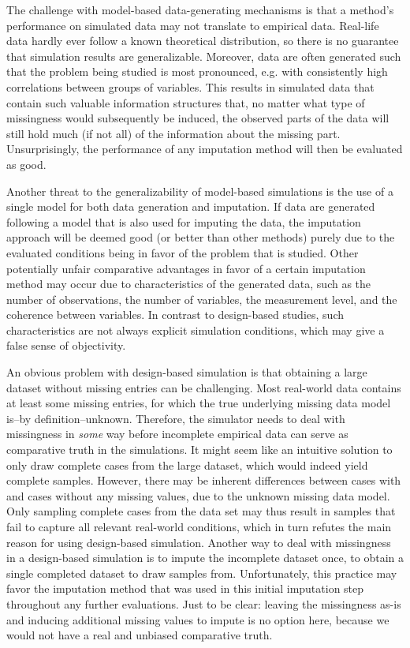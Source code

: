 \documentclass[bimj,fleqn]{w-art}
\begin{document}
The challenge with model-based data-generating mechanisms is that a method's performance on simulated data may not translate to empirical data. Real-life data hardly ever follow a known theoretical distribution, so there is no guarantee that simulation results are generalizable. Moreover, data are often generated such that the problem being studied is most pronounced, e.g. with consistently high correlations between groups of variables. This results in simulated data that contain such valuable information structures that, no matter what type of missingness would subsequently be induced, the observed parts of the data will still hold much (if not all) of the information about the missing part. Unsurprisingly, the performance of any imputation method will then be evaluated as good.

Another threat to the generalizability of model-based simulations is the use of a single model for both data generation and imputation. If data are generated following a model that is also used for imputing the data, the imputation approach will be deemed good (or better than other methods) purely due to the evaluated conditions being in favor of the problem that is studied. Other potentially unfair comparative advantages in favor of a certain imputation method may occur due to characteristics of the generated data, such as the number of observations, the number of variables, the measurement level, and the coherence between variables. In contrast to design-based studies, such characteristics are not always explicit simulation conditions, which may give a false sense of objectivity.

An obvious problem with design-based simulation is that obtaining a large dataset without missing entries can be challenging. Most real-world data contains at least some missing entries, for which the true underlying missing data model is--by definition--unknown. Therefore, the simulator needs to deal with missingness in \textit{some} way before incomplete empirical data can serve as comparative truth in the simulations. It might seem like an intuitive solution to only draw complete cases from the large dataset, which would indeed yield complete samples. However, there may be inherent differences between cases with and cases without any missing values, due to the unknown missing data model. Only sampling complete cases from the data set may thus result in samples that fail to capture all relevant real-world conditions, which in turn refutes the main reason for using design-based simulation. Another way to deal with missingness in a design-based simulation is to impute the incomplete dataset once, to obtain a single completed dataset to draw samples from. Unfortunately, this practice may favor the imputation method that was used in this initial imputation step throughout any further evaluations. Just to be clear: leaving the missingness as-is and inducing additional missing values to impute is no option here, because we would not have a real and unbiased comparative truth.
\end{document}
